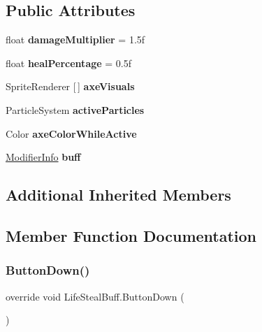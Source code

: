 \subsection*{Public Attributes}
\begin{DoxyCompactItemize}
\item 
\hypertarget{class_life_steal_buff_a37d7524d5a104452c10c79d33d9bea40}{}\label{class_life_steal_buff_a37d7524d5a104452c10c79d33d9bea40} 
float {\bfseries damage\+Multiplier} = 1.\+5f
\item 
\hypertarget{class_life_steal_buff_afafc61bf6f5e04749ba4a4dc6c345c0f}{}\label{class_life_steal_buff_afafc61bf6f5e04749ba4a4dc6c345c0f} 
float {\bfseries heal\+Percentage} = 0.\+5f
\item 
\hypertarget{class_life_steal_buff_ae5d24df046935c905e533fc044d9ed98}{}\label{class_life_steal_buff_ae5d24df046935c905e533fc044d9ed98} 
Sprite\+Renderer \mbox{[}$\,$\mbox{]} {\bfseries axe\+Visuals}
\item 
\hypertarget{class_life_steal_buff_a42e8781116deefe00fa1de7c8e933146}{}\label{class_life_steal_buff_a42e8781116deefe00fa1de7c8e933146} 
Particle\+System {\bfseries active\+Particles}
\item 
\hypertarget{class_life_steal_buff_a3a9d75978476750aa39972f2f808e88d}{}\label{class_life_steal_buff_a3a9d75978476750aa39972f2f808e88d} 
Color {\bfseries axe\+Color\+While\+Active}
\item 
\hypertarget{class_life_steal_buff_a3d574d51cf1b079e457412259da92ef5}{}\label{class_life_steal_buff_a3d574d51cf1b079e457412259da92ef5} 
\hyperlink{struct_modifier_info}{Modifier\+Info} {\bfseries buff}
\end{DoxyCompactItemize}
\subsection*{Additional Inherited Members}


\subsection{Member Function Documentation}
\hypertarget{class_life_steal_buff_a22a12c1a3e2dff97bf739a0488001000}{}\label{class_life_steal_buff_a22a12c1a3e2dff97bf739a0488001000} 
\subsubsection{\texorpdfstring{Button\+Down()}{ButtonDown()}}
{\footnotesize\ttfamily override void Life\+Steal\+Buff.\+Button\+Down (\begin{DoxyParamCaption}{ }\end{DoxyParamCaption})\hspace{0.3cm}{\ttfamily [virtual]}}



